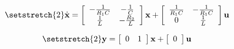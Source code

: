 \[ \setstretch{2}
  \dot{\textbf{x}}=
  \left[
    {\begin{array}{cc}
      -\frac{1}{R_1 C} & -\frac{1}{C} \\
      \frac{1}{L}      & -\frac{R_2}{L} \\
    \end{array}}
  \right]
  \textbf{x} +
  \left[
    {\begin{array}{cc}
      \frac{1}{R_1 C} & -\frac{1}{R_1 C} \\
      0               & \frac{1}{L} \\
    \end{array}}
  \right]
  \textbf{u}
\]

\[ \setstretch{2}
  \textbf{y}=
  \left[
    {\begin{array}{ccc}
      0 & 1 \\
    \end{array}}
  \right]
  \textbf{x} +
  \left[
    {\begin{array}{cc}
      0 \\
    \end{array}}
  \right]
  \textbf{u}
\]

